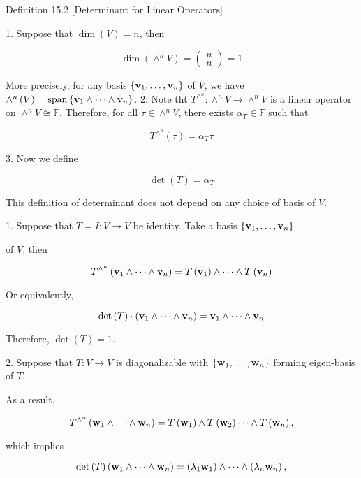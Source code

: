 \documentclass[11pt]{article}
\begin{document}
Definition 15.2 [Determinant for Linear Operators]

1. Suppose that \(\dim \left( V\right)  = n\), then

\[
\dim \left( {{ \land  }^nV}\right)  = \left( \begin{array}{l} n \\  n \end{array}\right)  = 1
\]

More precisely, for any basis \(\left\{  {{\bf v}_1,\ldots ,{\bf v}_n}\right\}\) of \(V\), we have \({ \land  }^n\left( V\right)  = \operatorname{span}\left\{  {{\bf v}_1 \land  \cdots  \land  {\bf v}_n}\right\}\). 2. Note tht \({T}^{{ \land  }^n} : { \land  }^nV \rightarrow  { \land  }^nV\) is a linear operator on \({ \land  }^nV \cong  \mathbb{F}\). Therefore, for all \(\tau  \in  { \land  }^nV\), there exists \(\alpha_{T} \in  \mathbb{F}\) such that

\[
{T}^{{ \land  }^n}\left( \tau \right)  = \alpha_{T}\tau
\]

3. Now we define

\[
\det \left( T\right)  = \alpha_{T}
\]

This definition of determinant does not depend on any choice of basis of \(V\).

1. Suppose that \(T = I : V \rightarrow  V\) be identity. Take a basis \(\left\{  {{\bf v}_1,\ldots ,{\bf v}_n}\right\}\)

of \(V\), then

\[
{T}^{{ \land  }^n}\left( {{\bf v}_1 \land  \cdots  \land  {\bf v}_n}\right)  = T\left( {\bf v}_1\right)  \land  \cdots  \land  T\left( {\bf v}_n\right)
\]

Or equivalently,

\[
\det \left( T\right)  \cdot  \left( {{\bf v}_1 \land  \cdots  \land  {\bf v}_n}\right)  = {\bf v}_1 \land  \cdots  \land  {\bf v}_n
\]

Therefore, \(\det \left( T\right)  = 1\).

2. Suppose that \(T : V \rightarrow  V\) is diagonalizable with \(\left\{  {{\bf w}_1,\ldots ,{\bf w}_n}\right\}\) forming eigen-basis of \(T\).

As a result,

\[
{T}^{{ \land  }^n}\left( {{\bf w}_1 \land  \cdots  \land  {\bf w}_n}\right)  = T\left( {\bf w}_1\right)  \land  T\left( {\bf w}_2\right) \cdots  \land  T\left( {\bf w}_n\right) ,
\]

which implies

\[
\det \left( T\right) \left( {{\bf w}_1 \land  \cdots  \land  {\bf w}_n}\right)  = \left( {{\lambda }_1{\bf w}_1}\right)  \land  \cdots  \land  \left( {{\lambda }_n{\bf w}_n}\right) ,
\]
\end{document}
